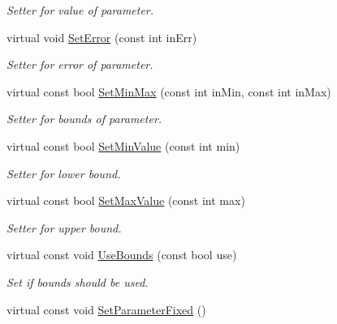 \begin{DoxyCompactItemize}
\begin{DoxyCompactList}\small\item\em Setter for value of parameter. \end{DoxyCompactList}\item 
\hypertarget{class_integer_parameter_a91d73f38cbbf3a344a9355c459a34145}{virtual void \hyperlink{class_integer_parameter_a91d73f38cbbf3a344a9355c459a34145}{Set\-Error} (const int in\-Err)}\label{class_integer_parameter_a91d73f38cbbf3a344a9355c459a34145}

\begin{DoxyCompactList}\small\item\em Setter for error of parameter. \end{DoxyCompactList}\item 
\hypertarget{class_integer_parameter_ace6b35a334076dafd65124709c096098}{virtual const bool \hyperlink{class_integer_parameter_ace6b35a334076dafd65124709c096098}{Set\-Min\-Max} (const int in\-Min, const int in\-Max)}\label{class_integer_parameter_ace6b35a334076dafd65124709c096098}

\begin{DoxyCompactList}\small\item\em Setter for bounds of parameter. \end{DoxyCompactList}\item 
virtual const bool \hyperlink{class_integer_parameter_a8a9aa6481a17e2f9c81c72c758050b95}{Set\-Min\-Value} (const int min)
\begin{DoxyCompactList}\small\item\em Setter for lower bound. \end{DoxyCompactList}\item 
virtual const bool \hyperlink{class_integer_parameter_a25e9abebc74581a887aadbd6c60e431f}{Set\-Max\-Value} (const int max)
\begin{DoxyCompactList}\small\item\em Setter for upper bound. \end{DoxyCompactList}\item 
\hypertarget{class_integer_parameter_aed709aa9573ad1ebd0e6bdd0923847cc}{virtual const void \hyperlink{class_integer_parameter_aed709aa9573ad1ebd0e6bdd0923847cc}{Use\-Bounds} (const bool use)}\label{class_integer_parameter_aed709aa9573ad1ebd0e6bdd0923847cc}

\begin{DoxyCompactList}\small\item\em Set if bounds should be used. \end{DoxyCompactList}\item 
\hypertarget{class_integer_parameter_a0b2857e6e04aa72260601eb1d8d04822}{virtual const void \hyperlink{class_integer_parameter_a0b2857e6e04aa72260601eb1d8d04822}{Set\-Parameter\-Fixed} ()}\label{class_integer_parameter_a0b2857e6e04aa72260601eb1d8d04822}


\end{DoxyCompactItemize}
